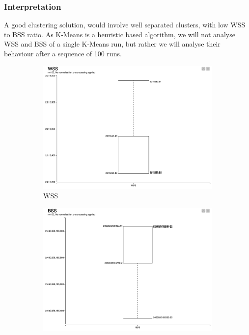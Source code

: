 \documentclass[11pt]{article}
\begin{document}
			\subsubsection*{Interpretation}
				A good clustering solution, would involve well separated clusters, with low WSS to BSS ratio\cite{???}. As K-Means is a heuristic based algorithm, we will not analyse WSS and BSS of a single K-Means run, but rather we will analyse their behaviour after a sequence of 100 runs. 
				\iftrue
				\begin{figure}[H]
					
					\centering
					\begin{subfigure}{0.4\textwidth}
						\includegraphics[width=\textwidth]{res/t1/t15/t15-WSS-plot}
						\caption{WSS}
						\label{fig:first}
					\end{subfigure}
					\hfill
					\begin{subfigure}{0.4\textwidth}
						\includegraphics[width=\textwidth]{res/t1/t15/t15-BSS-plot}

\end{subfigure}
\end{figure}
\end{document}

